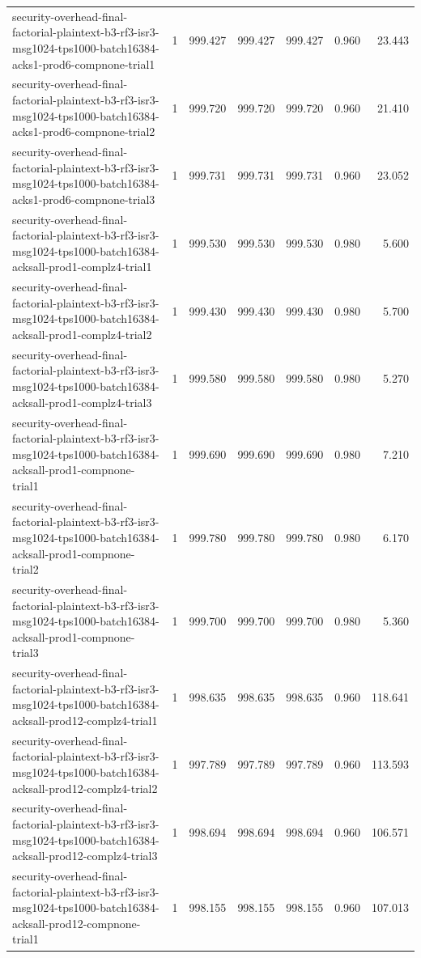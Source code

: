 \begin{tabular}{lrrrrrr}
security-overhead-final-factorial-plaintext-b3-rf3-isr3-msg1024-tps1000-batch16384-acks1-prod6-compnone-trial1 & 1 & 999.427 & 999.427 & 999.427 & 0.960 & 23.443 \\
security-overhead-final-factorial-plaintext-b3-rf3-isr3-msg1024-tps1000-batch16384-acks1-prod6-compnone-trial2 & 1 & 999.720 & 999.720 & 999.720 & 0.960 & 21.410 \\
security-overhead-final-factorial-plaintext-b3-rf3-isr3-msg1024-tps1000-batch16384-acks1-prod6-compnone-trial3 & 1 & 999.731 & 999.731 & 999.731 & 0.960 & 23.052 \\
security-overhead-final-factorial-plaintext-b3-rf3-isr3-msg1024-tps1000-batch16384-acksall-prod1-complz4-trial1 & 1 & 999.530 & 999.530 & 999.530 & 0.980 & 5.600 \\
security-overhead-final-factorial-plaintext-b3-rf3-isr3-msg1024-tps1000-batch16384-acksall-prod1-complz4-trial2 & 1 & 999.430 & 999.430 & 999.430 & 0.980 & 5.700 \\
security-overhead-final-factorial-plaintext-b3-rf3-isr3-msg1024-tps1000-batch16384-acksall-prod1-complz4-trial3 & 1 & 999.580 & 999.580 & 999.580 & 0.980 & 5.270 \\
security-overhead-final-factorial-plaintext-b3-rf3-isr3-msg1024-tps1000-batch16384-acksall-prod1-compnone-trial1 & 1 & 999.690 & 999.690 & 999.690 & 0.980 & 7.210 \\
security-overhead-final-factorial-plaintext-b3-rf3-isr3-msg1024-tps1000-batch16384-acksall-prod1-compnone-trial2 & 1 & 999.780 & 999.780 & 999.780 & 0.980 & 6.170 \\
security-overhead-final-factorial-plaintext-b3-rf3-isr3-msg1024-tps1000-batch16384-acksall-prod1-compnone-trial3 & 1 & 999.700 & 999.700 & 999.700 & 0.980 & 5.360 \\
security-overhead-final-factorial-plaintext-b3-rf3-isr3-msg1024-tps1000-batch16384-acksall-prod12-complz4-trial1 & 1 & 998.635 & 998.635 & 998.635 & 0.960 & 118.641 \\
security-overhead-final-factorial-plaintext-b3-rf3-isr3-msg1024-tps1000-batch16384-acksall-prod12-complz4-trial2 & 1 & 997.789 & 997.789 & 997.789 & 0.960 & 113.593 \\
security-overhead-final-factorial-plaintext-b3-rf3-isr3-msg1024-tps1000-batch16384-acksall-prod12-complz4-trial3 & 1 & 998.694 & 998.694 & 998.694 & 0.960 & 106.571 \\
security-overhead-final-factorial-plaintext-b3-rf3-isr3-msg1024-tps1000-batch16384-acksall-prod12-compnone-trial1 & 1 & 998.155 & 998.155 & 998.155 & 0.960 & 107.013 \\

\end{tabular}
